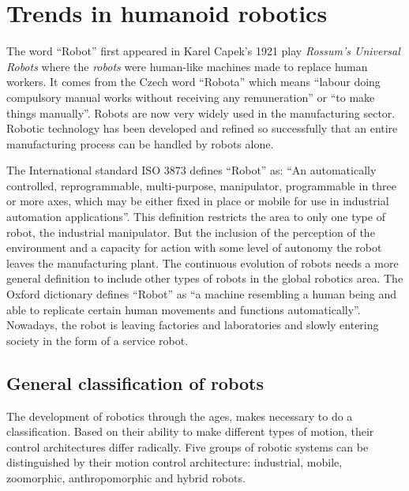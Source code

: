 \section{Trends in humanoid robotics}

The word ``Robot'' first appeared in Karel Capek's 1921 play \textit{Rossum's Universal Robots} where the \textit{robots} were human-like machines made to replace human workers. It comes from the Czech word ``Robota'' which means ``labour doing compulsory manual works without receiving any remuneration'' or ``to make things manually''. Robots are now very widely used in the manufacturing sector. Robotic technology has been developed and refined so successfully that an entire manufacturing process can be handled by robots alone.

The International standard ISO 3873 defines ``Robot'' as: ``An automatically controlled, reprogrammable, multi-purpose, manipulator, programmable in three or more axes, which may be either fixed in place or mobile for use in industrial automation applications''. This definition restricts the area to only one type of robot, the industrial manipulator. But the inclusion of the perception of the environment and a capacity for action with some level of autonomy the robot leaves the manufacturing plant. The continuous evolution of robots needs a more general definition to include other types of robots in the global robotics area. The Oxford dictionary defines ``Robot'' as ``a machine resembling a human being and able to replicate certain human movements and functions automatically''. Nowadays, the robot is leaving factories and laboratories and slowly entering society in the form of a service robot.

\subsection{General classification of robots}
The development of robotics through the ages, makes necessary to do a classification. Based on their ability to make different types of motion, their control architectures differ radically. Five groups of robotic systems can be distinguished by their motion control architecture: industrial, mobile, zoomorphic, anthropomorphic and hybrid robots.

